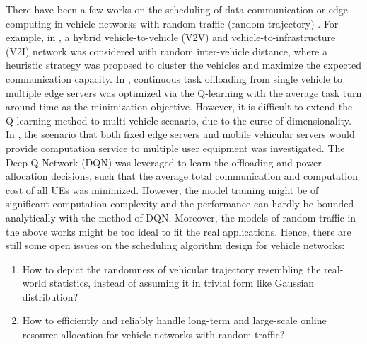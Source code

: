 There have been a few works on the scheduling of data communication or edge computing in vehicle networks with random traffic (random trajectory)
\cite{TVT18-Ni, Access19-Liu, TVT19-Liu, WC16-Salahuddin, TITS16-Wang}.
For example, in \cite{TVT18-Ni}, a hybrid vehicle-to-vehicle (V2V) and vehicle-to-infrastructure (V2I) network was considered with random inter-vehicle distance, where a heuristic strategy was proposed to cluster the vehicles and maximize the expected communication capacity.
In \cite{Access19-Liu}, continuous task offloading from single vehicle to multiple edge servers was optimized via the Q-learning with the average task turn around time as the minimization objective. However, it is difficult to extend the Q-learning method to multi-vehicle scenario, due to the curse of dimensionality.
In \cite{TVT19-Liu}, the scenario that both fixed edge servers and mobile vehicular servers would provide computation service to multiple user equipment was investigated. The Deep Q-Network (DQN) was leveraged to learn the offloading and power allocation decisions, such that the average total communication and computation cost of all UEs was minimized. However, the model training might be of significant computation complexity and the performance can hardly be bounded analytically with the method of DQN. Moreover, the models of random traffic in the above works might be too ideal to fit the real applications. Hence, there are still some open issues on the scheduling algorithm design for vehicle networks:
\begin{enumerate}
    \item How to depict the randomness of vehicular trajectory resembling the real-world statistics, instead of assuming it in trivial form like Gaussian distribution?
    \item How to efficiently and reliably handle long-term and large-scale online resource allocation for vehicle networks with random traffic?
\end{enumerate}

